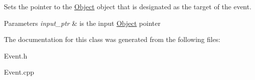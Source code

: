 Sets the pointer to the \hyperlink{class_object}{Object} object that is designated as the target of the event. 


\begin{DoxyParams}{Parameters}
{\em input\+\_\+ptr} & is the input \hyperlink{class_object}{Object} pointer \\
\hline
\end{DoxyParams}


The documentation for this class was generated from the following files\+:\begin{DoxyCompactItemize}
\item 
Event.\+h\item 
Event.\+cpp\end{DoxyCompactItemize}
